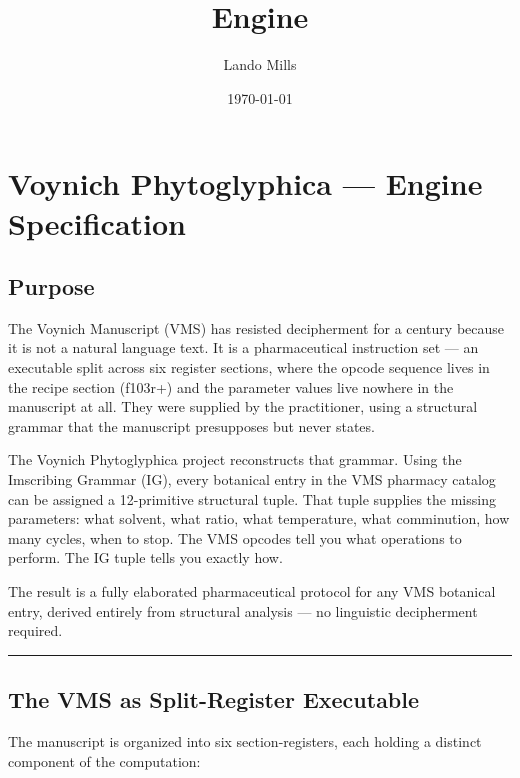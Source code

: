 \documentclass[12pt,a4paper]{article}
\title{Engine}
\date{\today}
\author{Lando Mills}
\begin{document}
\maketitle
\hypertarget{voynich-phytoglyphica-engine-specification}{%
\section{Voynich Phytoglyphica --- Engine
Specification}\label{voynich-phytoglyphica-engine-specification}}

\hypertarget{purpose}{%
\subsection{Purpose}\label{purpose}}

The Voynich Manuscript (VMS) has resisted decipherment for a century
because it is not a natural language text. It is a pharmaceutical
instruction set --- an executable split across six register sections,
where the opcode sequence lives in the recipe section (f103r+) and the
parameter values live nowhere in the manuscript at all. They were
supplied by the practitioner, using a structural grammar that the
manuscript presupposes but never states.

The Voynich Phytoglyphica project reconstructs that grammar. Using the
Imscribing Grammar (IG), every botanical entry in the VMS pharmacy
catalog can be assigned a 12-primitive structural tuple. That tuple
supplies the missing parameters: what solvent, what ratio, what
temperature, what comminution, how many cycles, when to stop. The VMS
opcodes tell you what operations to perform. The IG tuple tells you
exactly how.

The result is a fully elaborated pharmaceutical protocol for any VMS
botanical entry, derived entirely from structural analysis --- no
linguistic decipherment required.

\begin{center}\rule{0.5\linewidth}{0.5pt}\end{center}

\hypertarget{the-vms-as-split-register-executable}{%
\subsection{The VMS as Split-Register
Executable}\label{the-vms-as-split-register-executable}}

The manuscript is organized into six section-registers, each holding a
distinct component of the computation:
\end{document}
